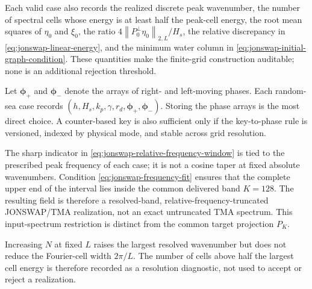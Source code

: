 \documentclass[11pt]{article}
\newcommand{\norm}[1]{\left\lVert #1\right\rVert}
\begin{document}
Each valid case also records the realized discrete peak wavenumber, the
number of spectral cells whose energy is at least half the peak-cell energy,
the root mean squares of $\eta_0$ and $\xi_0$, the ratio
$4\norm{P_0^\perp\eta_0}_{2,L}/H_s$, the relative discrepancy in
\eqref{eq:jonswap-linear-energy}, and the minimum water column in
\eqref{eq:jonswap-initial-graph-condition}.  These quantities make the
finite-grid construction auditable; none is an additional rejection
threshold.

Let $\bm\phi_+$ and $\bm\phi_-$ denote the arrays of right- and left-moving
phases.  Each random-sea case records
$(h,H_s,k_p,\gamma,r_d,\bm\phi_+,\bm\phi_-)$.
Storing the phase arrays is the most direct choice.  A counter-based key is
also sufficient only if the key-to-phase rule is versioned, indexed by
physical mode, and stable across grid resolution.

The sharp indicator in \eqref{eq:jonswap-relative-frequency-window} is tied to
the prescribed peak frequency of each case; it is not a cosine taper at fixed
absolute wavenumbers.  Condition \eqref{eq:jonswap-frequency-fit} ensures that
the complete upper end of the interval lies inside the common delivered band
$K=128$.  The resulting field is therefore a resolved-band,
relative-frequency-truncated JONSWAP/TMA realization, not an exact
untruncated TMA spectrum.  This input-spectrum restriction is distinct from
the common target projection $P_K$.

Increasing $N$ at fixed $L$ raises the largest resolved wavenumber but does
not reduce the Fourier-cell width $2\pi/L$.  The number of cells above half
the largest cell energy is therefore recorded as a resolution diagnostic,
not used to accept or reject a realization.
\end{document}
